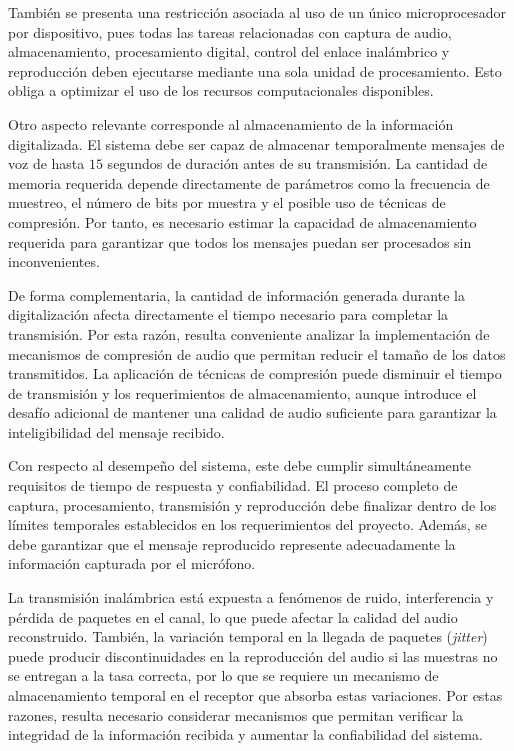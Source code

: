 También se presenta una restricción asociada al uso de un único microprocesador por dispositivo, pues todas las tareas relacionadas con captura de audio, almacenamiento, procesamiento digital, control del enlace inalámbrico y reproducción deben ejecutarse mediante una sola unidad de procesamiento.
Esto obliga a optimizar el uso de los recursos computacionales disponibles.

Otro aspecto relevante corresponde al almacenamiento de la información digitalizada.
El sistema debe ser capaz de almacenar temporalmente mensajes de voz de hasta $15$ segundos de duración antes de su transmisión.
La cantidad de memoria requerida depende directamente de parámetros como la frecuencia de muestreo, el número de bits por muestra y el posible uso de técnicas de compresión.
Por tanto, es necesario estimar la capacidad de almacenamiento requerida para garantizar que todos los mensajes puedan ser procesados sin inconvenientes.

De forma complementaria, la cantidad de información generada durante la digitalización afecta directamente el tiempo necesario para completar la transmisión.
Por esta razón, resulta conveniente analizar la implementación de mecanismos de compresión de audio que permitan reducir el tamaño de los datos transmitidos.
La aplicación de técnicas de compresión puede disminuir el tiempo de transmisión y los requerimientos de almacenamiento, aunque introduce el desafío adicional de mantener una calidad de audio suficiente para garantizar la inteligibilidad del mensaje recibido.

Con respecto al desempeño del sistema, este debe cumplir simultáneamente requisitos de tiempo de respuesta y confiabilidad.
El proceso completo de captura, procesamiento, transmisión y reproducción debe finalizar dentro de los límites temporales establecidos en los requerimientos del proyecto.
Además, se debe garantizar que el mensaje reproducido represente adecuadamente la información capturada por el micrófono.

La transmisión inalámbrica está expuesta a fenómenos de ruido, interferencia y pérdida de paquetes en el canal, lo que puede afectar la calidad del audio reconstruido.
También, la variación temporal en la llegada de paquetes (\textit{jitter}) puede producir discontinuidades en la reproducción del audio si las muestras no se entregan a la tasa correcta, por lo que se requiere un mecanismo de almacenamiento temporal en el receptor que absorba estas variaciones.
Por estas razones, resulta necesario considerar mecanismos que permitan verificar la integridad de la información recibida y aumentar la confiabilidad del sistema.

